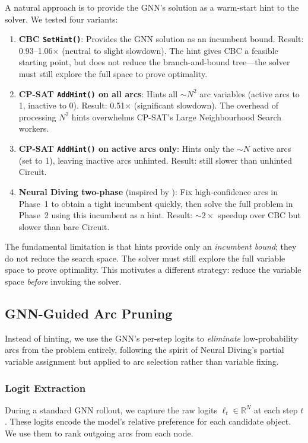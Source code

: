 \documentclass[conference]{IEEEtran}
\begin{document}
A natural approach is to provide the GNN's solution as a warm-start hint to the solver. We tested four variants:

\begin{enumerate}
\item \textbf{CBC \texttt{SetHint()}}: Provides the GNN solution as an incumbent bound. Result: 0.93--1.06$\times$ (neutral to slight slowdown). The hint gives CBC a feasible starting point, but does not reduce the branch-and-bound tree---the solver must still explore the full space to prove optimality.

\item \textbf{CP-SAT \texttt{AddHint()} on all arcs}: Hints all ${\sim}N^2$ arc variables (active arcs to 1, inactive to 0). Result: 0.51$\times$ (significant slowdown). The overhead of processing $N^2$ hints overwhelms CP-SAT's Large Neighbourhood Search workers.

\item \textbf{CP-SAT \texttt{AddHint()} on active arcs only}: Hints only the ${\sim}N$ active arcs (set to 1), leaving inactive arcs unhinted. Result: still slower than unhinted Circuit.

\item \textbf{Neural Diving two-phase} (inspired by \cite{nair2021neural}): Fix high-confidence arcs in Phase~1 to obtain a tight incumbent quickly, then solve the full problem in Phase~2 using this incumbent as a hint. Result: ${\sim}2\times$ speedup over CBC but slower than bare Circuit.
\end{enumerate}

The fundamental limitation is that hints provide only an \emph{incumbent bound}; they do not reduce the search space. The solver must still explore the full variable space to prove optimality. This motivates a different strategy: reduce the variable space \emph{before} invoking the solver.

\subsection{GNN-Guided Arc Pruning}

Instead of hinting, we use the GNN's per-step logits to \emph{eliminate} low-probability arcs from the problem entirely, following the spirit of Neural Diving's partial variable assignment \cite{nair2021neural} but applied to arc selection rather than variable fixing.

\subsubsection{Logit Extraction}
During a standard GNN rollout, we capture the raw logits $\ell_t \in \mathbb{R}^N$ at each step $t$. These logits encode the model's relative preference for each candidate object. We use them to rank outgoing arcs from each node.
\end{document}
